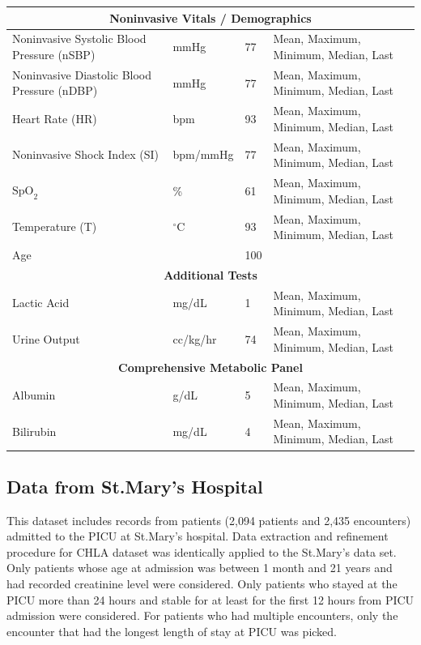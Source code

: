 \documentclass[
   technote
]{phildoc}
\begin{document}
\begin{table}[!htbp]
\begin{tabular}{| l | l | l | l |  }
\hline
\multicolumn{4}{|c|}{\textbf{Noninvasive Vitals / Demographics}} \\
\hline
Noninvasive Systolic Blood Pressure (nSBP)	&	mmHg		&	77	&	Mean, Maximum, Minimum, Median, Last\\
Noninvasive Diastolic Blood Pressure (nDBP)	&	mmHg		&	77	&	Mean, Maximum, Minimum, Median, Last\\
Heart Rate (HR)						&	bpm			&	93	&	Mean, Maximum, Minimum, Median, Last\\
Noninvasive Shock Index (SI)			&	bpm/mmHg	&	77	&	Mean, Maximum, Minimum, Median, Last\\
$\text{SpO}_2$						&	\%			&	61	&	Mean, Maximum, Minimum, Median, Last\\
Temperature (T)					&	$^\circ$C		&	93	&	Mean, Maximum, Minimum, Median, Last\\
Age								&				&	100	&	\\



\hline
\multicolumn{4}{|c|}{\textbf{Additional Tests}} \\
\hline
Lactic Acid					&	mg/dL	&	1	&	Mean, Maximum, Minimum, Median, Last\\
Urine Output				&	cc/kg/hr	&	74	&	Mean, Maximum, Minimum, Median, Last\\

\hline
\multicolumn{4}{|c|}{\textbf{Comprehensive Metabolic Panel}} \\
\hline
Albumin					&	g/dL		&	5	&	Mean, Maximum, Minimum, Median, Last\\
Bilirubin					&	mg/dL	&	4	&	Mean, Maximum, Minimum, Median, Last\\

\hline

\end{tabular}
\end{table}

\subsection{Data from St.Mary's Hospital}
This dataset includes records from patients (2,094 patients and 2,435 encounters) admitted to the PICU at St.Mary's hospital. Data extraction and refinement procedure for CHLA dataset was identically applied to the St.Mary's data set. Only patients whose age at admission was between 1 month and 21 years and had recorded creatinine level were considered. Only patients who stayed at the PICU more than 24 hours and stable for at least for the first 12 hours from PICU admission were considered. For patients who had multiple encounters, only the encounter that had the longest length of stay at PICU was picked. 
\end{document}
